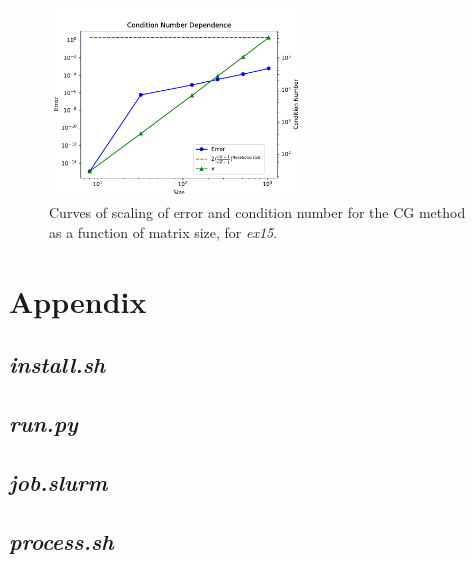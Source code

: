 \documentclass[12pt,letterpaper]{article}
\newcommand{\program}{\textit{ex15}}
\begin{document}
\begin{figure}[ht]
  \centering
  \includegraphics[width=0.6\textwidth,trim={0 0 0 0cm},clip]{results_fittedmodel.pdf}
  \caption{Curves of scaling of error and condition number for the CG method as a function of matrix size, for \program.}
  \label{fig:Ex4}
\end{figure}



\newpage
\section{Appendix}

\subsection{\textit{install.sh}}


\newpage
\subsection{\textit{run.py}}


\newpage
\subsection{\textit{job.slurm}}


\newpage
\subsection{\textit{process.sh}}

\end{document}
